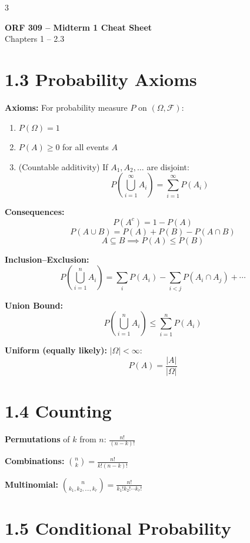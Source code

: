\documentclass[10pt,landscape]{article}
\begin{document}
\begin{multicols}{3}

\begin{center}
{\large\textbf{ORF 309 -- Midterm 1 Cheat Sheet}}\\
\small{Chapters 1 -- 2.3}
\end{center}

\section*{1.3 Probability Axioms}
\textbf{Axioms:} For probability measure $P$ on $(\Omega, \mathcal{F})$:
\begin{enumerate}[nosep, leftmargin=1.2em]
  \item $P(\Omega) = 1$
  \item $P(A) \geq 0$ for all events $A$
  \item (Countable additivity) If $A_1, A_2, \ldots$ are disjoint:
  \[
    P\!\left(\bigcup_{i=1}^{\infty} A_i\right) = \sum_{i=1}^{\infty} P(A_i)
  \]
\end{enumerate}

\textbf{Consequences:}
\[
  P(A^c) = 1 - P(A)
\]
\[
  P(A \cup B) = P(A) + P(B) - P(A \cap B)
\]
\[
  A \subseteq B \implies P(A) \leq P(B)
\]

\textbf{Inclusion--Exclusion:}
\[
  P\!\left(\bigcup_{i=1}^{n} A_i\right) = \sum_i P(A_i) - \sum_{i<j} P(A_i \cap A_j) + \cdots
\]

\textbf{Union Bound:}
\[
  P\!\left(\bigcup_{i=1}^{n} A_i\right) \leq \sum_{i=1}^{n} P(A_i)
\]

\textbf{Uniform (equally likely):} $|\Omega| < \infty$:
\[
  P(A) = \frac{|A|}{|\Omega|}
\]

\section*{1.4 Counting}
\textbf{Permutations} of $k$ from $n$: $\displaystyle \frac{n!}{(n-k)!}$

\textbf{Combinations:}
$\displaystyle \binom{n}{k} = \frac{n!}{k!(n-k)!}$

\textbf{Multinomial:} $\displaystyle \binom{n}{k_1, k_2, \ldots, k_r} = \frac{n!}{k_1! k_2! \cdots k_r!}$

\section*{1.5 Conditional Probability}


\end{multicols}
\end{document}
